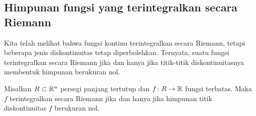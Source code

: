 \subsection{Himpunan fungsi yang terintegralkan secara Riemann}

Kita telah melihat bahwa fungsi kontinu terintegralkan secara Riemann, tetapi
beberapa jenis diskontinuitas tetap diperbolehkan.
Ternyata, suatu fungsi terintegralkan secara Riemann jika dan hanya jika
titik-titik diskontinuitasnya membentuk himpunan berukuran nol.

\begin{thm}%
%
%
Misalkan $R \subset {\mathbb{R}}^n$ persegi panjang tertutup dan $f \colon R \to {\mathbb{R}}$
fungsi terbatas. Maka $f$ terintegralkan secara Riemann jika dan hanya jika
himpunan titik diskontinuitas $f$ berukuran nol.
\end{thm}

